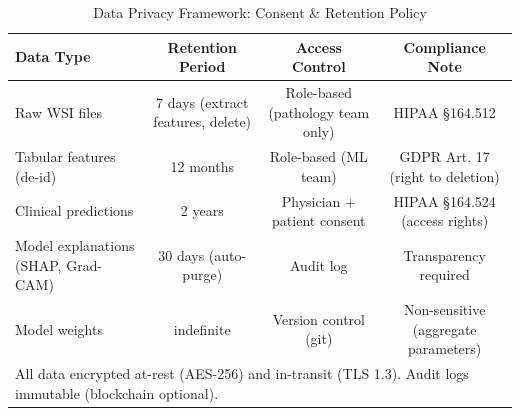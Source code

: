 \documentclass[11pt,a4paper]{article}
\begin{document}

\begin{table}[H]
\centering
\caption{Data Privacy Framework: Consent \& Retention Policy}
\small
\begin{tabular}{|l|c|c|c|}
\hline
\textbf{Data Type} & \textbf{Retention Period} & \textbf{Access Control} & \textbf{Compliance Note} \\
\hline
Raw WSI files & 7 days (extract features, delete) & Role-based (pathology team only) & HIPAA §164.512 \\
Tabular features (de-id) & 12 months & Role-based (ML team) & GDPR Art. 17 (right to deletion) \\
Clinical predictions & 2 years & Physician + patient consent & HIPAA §164.524 (access rights) \\
Model explanations (SHAP, Grad-CAM) & 30 days (auto-purge) & Audit log & Transparency required \\
Model weights & indefinite & Version control (git) & Non-sensitive (aggregate parameters) \\
\hline
\multicolumn{4}{l}{\small All data encrypted at-rest (AES-256) and in-transit (TLS 1.3). Audit logs immutable (blockchain optional).} \\
\hline
\end{tabular}
\label{tab:privacy_policy}
\end{table}

\end{document}
